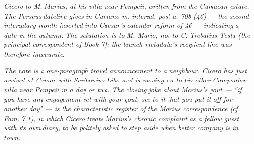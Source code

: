 
\textit{Cicero to M. Marius, at his villa near Pompeii, written
from the Cumaean estate. The Perseus dateline gives \textit{in
Cumano m. intercal. post a. 708 (46)} --- the second intercalary
month inserted into Caesar's calendar reform of 46 ---
indicating a date in the autumn. The salutation is to M. Mario,
not to C. Trebatius Testa (the principal correspondent of Book
7); the launch metadata's recipient line was therefore
inaccurate.}

\textit{The note is a one-paragraph travel announcement to a
neighbour. Cicero has just arrived at Cumae with Scribonius Libo
and is moving on to his other Campanian villa near Pompeii in a
day or two. The closing joke about Marius's gout --- ``if you
have any engagement set with your gout, see to it that you put
it off for another day'' --- is the characteristic register of
the Marius correspondence (cf. \textit{Fam.} 7.1), in which
Cicero treats Marius's chronic complaint as a fellow guest with
its own diary, to be politely asked to step aside when better
company is in town.}
